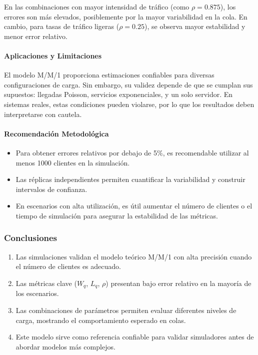 \documentclass{article}
\begin{document}
En las combinaciones con mayor intensidad de tráfico (como $\rho = 0.875$), los errores son más elevados, posiblemente por la mayor variabilidad en la cola. En cambio, para tasas de tráfico ligeras ($\rho = 0.25$), se observa mayor estabilidad y menor error relativo.

\paragraph{Aplicaciones y Limitaciones}
El modelo M/M/1 proporciona estimaciones confiables para diversas configuraciones de carga. Sin embargo, su validez depende de que se cumplan sus supuestos: llegadas Poisson, servicios exponenciales, y un solo servidor. En sistemas reales, estas condiciones pueden violarse, por lo que los resultados deben interpretarse con cautela.

\paragraph{Recomendación Metodológica}
\begin{itemize}
    \item Para obtener errores relativos por debajo de 5\%, es recomendable utilizar al menos 1000 clientes en la simulación.
    \item Las réplicas independientes permiten cuantificar la variabilidad y construir intervalos de confianza.
    \item En escenarios con alta utilización, es útil aumentar el número de clientes o el tiempo de simulación para asegurar la estabilidad de las métricas.
\end{itemize}

\subsubsection{Conclusiones}
\begin{enumerate}
    \item Las simulaciones validan el modelo teórico M/M/1 con alta precisión cuando el número de clientes es adecuado.
    \item Las métricas clave ($W_q$, $L_q$, $\rho$) presentan bajo error relativo en la mayoría de los escenarios.
    \item Las combinaciones de parámetros permiten evaluar diferentes niveles de carga, mostrando el comportamiento esperado en colas.
    \item Este modelo sirve como referencia confiable para validar simuladores antes de abordar modelos más complejos.
\end{enumerate}
\end{document}
